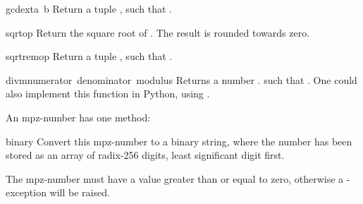 \begin{funcdesc}{gcdext}{a\, b}
  Return a tuple , such that
  .
\end{funcdesc}

\begin{funcdesc}{sqrt}{op}
  Return the square root of . The result is rounded towards zero.
\end{funcdesc}

\begin{funcdesc}{sqrtrem}{op}
  Return a tuple , such that
  .
\end{funcdesc}

\begin{funcdesc}{divm}{numerator\, denominator\, modulus}
  Returns a number . such that
  .
  One could also implement this function in Python, using .
\end{funcdesc}

An mpz-number has one method:

\renewcommand{\indexsubitem}{(mpz method)}
\begin{funcdesc}{binary}{}
  Convert this mpz-number to a binary string, where the number has been
  stored as an array of radix-256 digits, least significant digit first.

  The mpz-number must have a value greater than or equal to zero,
  otherwise a -exception will be raised.
\end{funcdesc}
